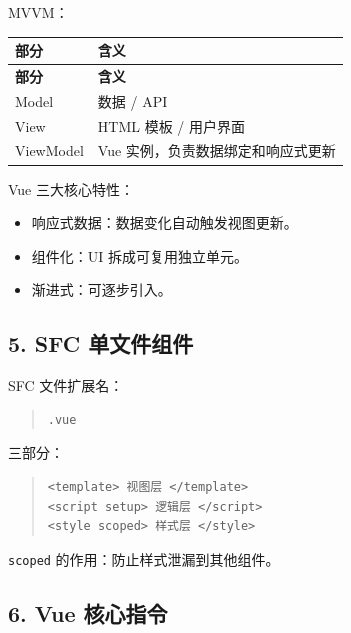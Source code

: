 \documentclass[UTF8,zihao=-4]{ctexart}
\begin{document}
MVVM：

{
\footnotesize
\begin{longtable}{|>{\raggedright\arraybackslash}p{}|>{\raggedright\arraybackslash}p{}|}
\hline
\textbf{部分} & \textbf{含义} \\
\hline
\endfirsthead
\hline
\textbf{部分} & \textbf{含义} \\
\hline
\endhead
Model & 数据 / API \\
\hline
View & HTML 模板 / 用户界面 \\
\hline
ViewModel & Vue 实例，负责数据绑定和响应式更新 \\
\hline
\end{longtable}
}


Vue 三大核心特性：

\begin{itemize}
\item 响应式数据：数据变化自动触发视图更新。
\item 组件化：UI 拆成可复用独立单元。
\item 渐进式：可逐步引入。
\end{itemize}

\subsection{5. SFC 单文件组件}

SFC 文件扩展名：

\begin{quote}
\footnotesize
\begin{verbatim}
.vue
\end{verbatim}
\end{quote}

三部分：

\begin{quote}
\footnotesize
\begin{verbatim}
<template> 视图层 </template>
<script setup> 逻辑层 </script>
<style scoped> 样式层 </style>
\end{verbatim}
\end{quote}

\texttt{scoped} 的作用：防止样式泄漏到其他组件。

\subsection{6. Vue 核心指令}
\end{document}
